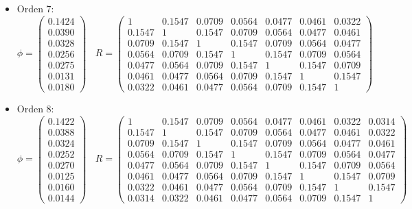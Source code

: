 \begin{itemize}
\item Orden 7:
\begin{equation*}
	\phi = 
	\begin{pmatrix}
		0.1424 \\
		0.0390 \\
		0.0328 \\
		0.0256 \\
		0.0275 \\
		0.0131 \\
		0.0180 
	\end{pmatrix}	\	\	\	\
	R =
	\begin{pmatrix}
	1 & 0.1547 & 0.0709 & 0.0564 & 0.0477 & 0.0461 & 0.0322 \\
	0.1547 & 1 & 0.1547 & 0.0709 & 0.0564 & 0.0477 & 0.0461 \\
	0.0709 & 0.1547 & 1 & 0.1547 & 0.0709 & 0.0564 & 0.0477 \\
	0.0564 & 0.0709 & 0.1547 & 1 & 0.1547 & 0.0709 & 0.0564 \\
	0.0477 & 0.0564 & 0.0709 & 0.1547 & 1 & 0.1547 & 0.0709 \\
	0.0461 & 0.0477 & 0.0564 & 0.0709 & 0.1547 & 1 & 0.1547 \\
	0.0322 & 0.0461 & 0.0477 & 0.0564 & 0.0709 & 0.1547 & 1	  
	\end{pmatrix}
\end{equation*}

\item Orden 8:
\begin{equation*}
	\phi = 
	\begin{pmatrix}
		0.1422 \\
		0.0388 \\
		0.0324 \\
		0.0252 \\
		0.0270 \\
		0.0125 \\
		0.0160 \\
		0.0144  
	\end{pmatrix}	\	\	\	\
	R =
	\begin{pmatrix}	
	1 & 0.1547 & 0.0709 & 0.0564 & 0.0477 & 0.0461 & 0.0322 & 0.0314 \\
	0.1547 & 1 & 0.1547 & 0.0709 & 0.0564 & 0.0477 & 0.0461 & 0.0322 \\
	0.0709 & 0.1547 & 1 & 0.1547 & 0.0709 & 0.0564 & 0.0477 & 0.0461 \\
	0.0564 & 0.0709 & 0.1547 & 1 & 0.1547 & 0.0709 & 0.0564 & 0.0477 \\
	0.0477 & 0.0564 & 0.0709 & 0.1547 & 1 & 0.1547 & 0.0709 & 0.0564 \\
	0.0461 & 0.0477 & 0.0564 & 0.0709 & 0.1547 & 1 & 0.1547 & 0.0709 \\
	0.0322 & 0.0461 & 0.0477 & 0.0564 & 0.0709 & 0.1547 & 1 & 0.1547 \\
	0.0314 & 0.0322 & 0.0461 & 0.0477 & 0.0564 & 0.0709 & 0.1547 & 1					  
	\end{pmatrix}
\end{equation*}


\end{itemize}

